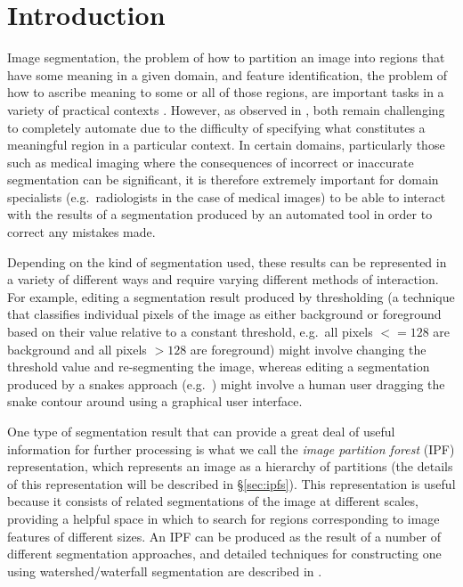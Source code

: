 \documentclass[10pt,twocolumn,twoside]{IEEEtran}
\begin{document}
\section{Introduction}


Image segmentation, the problem of how to partition an image into regions that have some meaning in a given domain, and feature identification, the problem of how to ascribe meaning to some or all of those regions, are important tasks in a variety of practical contexts \cite{?}. However, as observed in \cite{golodetz11}, both remain challenging to completely automate due to the difficulty of specifying what constitutes a meaningful region in a particular context. In certain domains, particularly those such as medical imaging where the consequences of incorrect or inaccurate segmentation can be significant, it is therefore extremely important for domain specialists (e.g.~radiologists in the case of medical images) to be able to interact with the results of a segmentation produced by an automated tool in order to correct any mistakes made.

Depending on the kind of segmentation used\footnotemark, these results can be represented in a variety of different ways and require varying different methods of interaction. For example, editing a segmentation result produced by thresholding (a technique that classifies individual pixels of the image as either background or foreground based on their value relative to a constant threshold, e.g.~all pixels $<= 128$ are background and all pixels $> 128$ are foreground) might involve changing the threshold value and re-segmenting the image, whereas editing a segmentation produced by a snakes approach (e.g.~\cite{kass88,lobregt95}) might involve a human user dragging the snake contour around using a graphical user interface.


One type of segmentation result that can provide a great deal of useful information for further processing is what we call the \emph{image partition forest} (IPF) representation\footnotemark, which represents an image as a hierarchy of partitions (the details of this representation will be described in \S\ref{sec:ipfs}). This representation is useful because it consists of related segmentations of the image at different scales, providing a helpful space in which to search for regions corresponding to image features of different sizes. An IPF can be produced as the result of a number of different segmentation approaches, and detailed techniques for constructing one using watershed/waterfall segmentation are described in \cite{golodetz11}.
\end{document}
